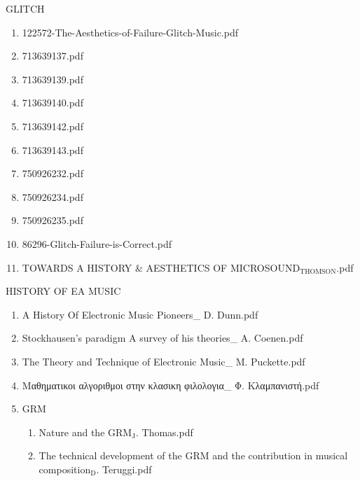 \documentclass[11pt]{article}
\begin{document}
\item GLITCH
\label{sec-1-1-1-1-49-1-13}
\begin{enumerate}
\item 122572-The-Aesthetics-of-Failure-Glitch-Music.pdf
\label{sec-1-1-1-1-49-1-13-1}

\item 713639137.pdf
\label{sec-1-1-1-1-49-1-13-2}

\item 713639139.pdf
\label{sec-1-1-1-1-49-1-13-3}

\item 713639140.pdf
\label{sec-1-1-1-1-49-1-13-4}

\item 713639142.pdf
\label{sec-1-1-1-1-49-1-13-5}

\item 713639143.pdf
\label{sec-1-1-1-1-49-1-13-6}

\item 750926232.pdf
\label{sec-1-1-1-1-49-1-13-7}

\item 750926234.pdf
\label{sec-1-1-1-1-49-1-13-8}

\item 750926235.pdf
\label{sec-1-1-1-1-49-1-13-9}

\item 86296-Glitch-Failure-is-Correct.pdf
\label{sec-1-1-1-1-49-1-13-10}

\item TOWARDS A HISTORY \& AESTHETICS OF MICROSOUND$_{\text{THOMSON}}$.pdf
\label{sec-1-1-1-1-49-1-13-11}
\end{enumerate}

\item HISTORY OF EA MUSIC
\label{sec-1-1-1-1-49-1-14}
\begin{enumerate}
\item A History Of Electronic Music Pioneers\_ D. Dunn.pdf
\label{sec-1-1-1-1-49-1-14-1}

\item Stockhausen's paradigm A survey of his theories\_ A. Coenen.pdf
\label{sec-1-1-1-1-49-1-14-2}

\item The Theory and Technique of Electronic Music\_ M. Puckette.pdf
\label{sec-1-1-1-1-49-1-14-3}

\item Μαθηματικοι αλγοριθμοι στην κλασικη φιλολογια\_ Φ. Κλαμπανιστή.pdf
\label{sec-1-1-1-1-49-1-14-4}

\item GRM
\label{sec-1-1-1-1-49-1-14-5}
\begin{enumerate}
\item Nature and the GRM$_{\text{J}}$. Thomas.pdf
\label{sec-1-1-1-1-49-1-14-5-1}

\item The technical development of the GRM and the contribution in musical composition$_{\text{D}}$. Teruggi.pdf
\label{sec-1-1-1-1-49-1-14-5-2}
\end{enumerate}
\end{enumerate}
\end{document}
